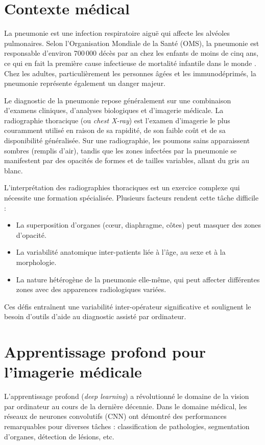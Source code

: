 \documentclass[12pt,a4paper,twoside]{report}
\begin{document}
\section{Contexte médical}

La pneumonie est une infection respiratoire aiguë qui affecte les alvéoles pulmonaires. Selon l'Organisation Mondiale de la Santé (OMS), la pneumonie est responsable d'environ 700\,000 décès par an chez les enfants de moins de cinq ans, ce qui en fait la première cause infectieuse de mortalité infantile dans le monde \cite{who-pneumonia}. Chez les adultes, particulièrement les personnes âgées et les immunodéprimés, la pneumonie représente également un danger majeur.

Le diagnostic de la pneumonie repose généralement sur une combinaison d'examens cliniques, d'analyses biologiques et d'imagerie médicale. La radiographie thoracique (ou \textit{chest X-ray}) est l'examen d'imagerie le plus couramment utilisé en raison de sa rapidité, de son faible coût et de sa disponibilité généralisée. Sur une radiographie, les poumons sains apparaissent sombres (remplis d'air), tandis que les zones infectées par la pneumonie se manifestent par des opacités de formes et de tailles variables, allant du gris au blanc.

L'interprétation des radiographies thoraciques est un exercice complexe qui nécessite une formation spécialisée. Plusieurs facteurs rendent cette tâche difficile :
\begin{itemize}
  \item La superposition d'organes (cœur, diaphragme, côtes) peut masquer des zones d'opacité.
  \item La variabilité anatomique inter-patients liée à l'âge, au sexe et à la morphologie.
  \item La nature hétérogène de la pneumonie elle-même, qui peut affecter différentes zones avec des apparences radiologiques variées.
\end{itemize}

Ces défis entraînent une variabilité inter-opérateur significative et soulignent le besoin d'outils d'aide au diagnostic assisté par ordinateur.

\section{Apprentissage profond pour l'imagerie médicale}

L'apprentissage profond (\textit{deep learning}) a révolutionné le domaine de la vision par ordinateur au cours de la dernière décennie. Dans le domaine médical, les réseaux de neurones convolutifs (CNN) ont démontré des performances remarquables pour diverses tâches : classification de pathologies, segmentation d'organes, détection de lésions, etc.
\end{document}

